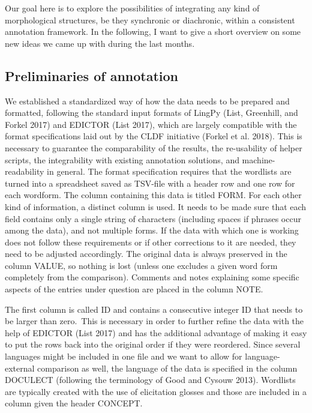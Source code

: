 \documentclass[
  a4paper,
  14pt,
  oneside,
  tablecaptionabove
]{scrbook}
\begin{document}
Our goal here is to explore the possibilities of integrating any kind of
morphological structures, be they synchronic or diachronic, within a
consistent annotation framework. In the following, I want to give a
short overview on some new ideas we came up with during the last months.

\subsection*{Preliminaries of annotation}

We established a standardized way of how the data needs to be prepared
and formatted, following the standard input formats of LingPy (List,
Greenhill, and Forkel 2017) and EDICTOR (List 2017), which are largely
compatible with the format specifications laid out by the CLDF
initiative (Forkel et al. 2018). This is necessary to guarantee the
comparability of the results, the re-usability of helper scripts, the
integrability with existing annotation solutions, and
machine-readability in general. The format specification requires that
the wordlists are turned into a spreadsheet saved as TSV-file with a
header row and one row for each wordform. The column containing this
data is titled FORM. For each other kind of information, a distinct
column is used. It needs to be made sure that each field contains only a
single string of characters (including spaces if phrases occur among the
data), and not multiple forms. If the data with which one is working
does not follow these requirements or if other corrections to it are
needed, they need to be adjusted accordingly. The original data is
always preserved in the column VALUE, so nothing is lost (unless one
excludes a given word form completely from the comparison). Comments and
notes explaining some specific aspects of the entries under question are
placed in the column NOTE.

The first column is called ID and contains a consecutive integer ID that
needs to be larger than zero.~This is necessary in order to further
refine the data with the help of EDICTOR (List 2017) and has the
additional advantage of making it easy to put the rows back into the
original order if they were reordered. Since several languages might be
included in one file and we want to allow for language-external
comparison as well, the language of the data is specified in the column
DOCULECT (following the terminology of Good and Cysouw 2013). Wordlists
are typically created with the use of elicitation glosses and those are
included in a column given the header CONCEPT.
\end{document}

